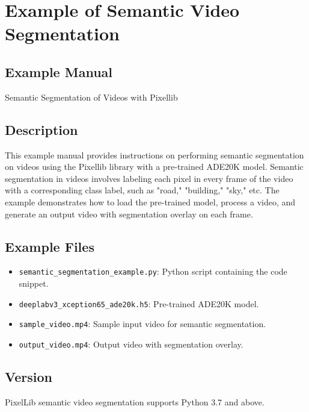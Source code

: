\section{Example of Semantic Video Segmentation}

\subsection{Example Manual}
Semantic Segmentation of Videos with Pixellib

\subsection{Description}
This example manual provides instructions on performing semantic segmentation on videos using the Pixellib library with a pre-trained ADE20K model. Semantic segmentation in videos involves labeling each pixel in every frame of the video with a corresponding class label, such as "road," "building," "sky," etc. The example demonstrates how to load the pre-trained model, process a video, and generate an output video with segmentation overlay on each frame.

\subsection{Example Files}
\begin{itemize}
    \item \texttt{semantic\_segmentation\_example.py}: Python script containing the code snippet.
    \item \texttt{deeplabv3\_xception65\_ade20k.h5}: Pre-trained ADE20K model.
    \item \texttt{sample\_video.mp4}: Sample input video for semantic segmentation.
    \item \texttt{output\_video.mp4}: Output video with segmentation overlay.
\end{itemize}

\subsection{Version}
PixelLib semantic video segmentation supports Python 3.7 and above.

